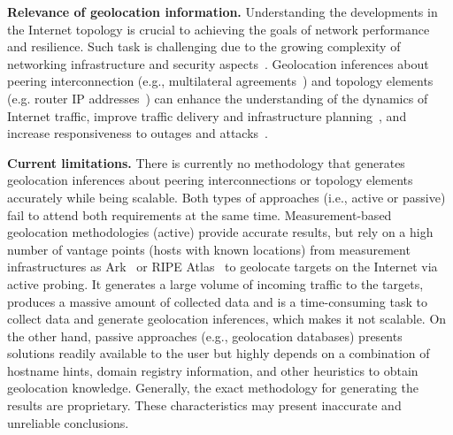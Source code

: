 	\textbf{Relevance of geolocation information.} Understanding the developments in the Internet topology is crucial to achieving the goals of network performance and resilience. Such task is challenging due to the growing complexity of networking infrastructure and security aspects~\cite{Giotsas:2015:MPI:2716281.2836122}. Geolocation inferences about peering interconnection (e.g., multilateral agreements~\cite{Giotsas:2013}) and topology elements (e.g. router IP addresses~\cite{8002903,Huffaker:2014:DDR:2656877.2656879}) can enhance the understanding of the dynamics of Internet traffic, improve traffic delivery and infrastructure planning~\cite{Calder:2013:MEG:2504730.2504754}, and increase responsiveness to outages and attacks~\cite{Giotsas:2017:DPI:3098822.3098855, marcos:2018:dynamix}. 


	\textbf{Current limitations.} There is currently no methodology that generates geolocation inferences about peering interconnections or topology elements accurately while being scalable. Both types of approaches (i.e., active or passive) fail to attend both requirements at the same time.  Measurement-based geolocation methodologies (active) provide accurate results, but rely on a high number of vantage points (hosts with known locations) from measurement infrastructures as Ark~\cite{ark} or RIPE Atlas~\cite{ripeatlas} to geolocate targets on the Internet via active probing. It generates a large volume of incoming traffic to the targets, produces a massive amount of collected data and is a time-consuming task to collect data and generate geolocation inferences, which makes it not scalable.  On the other hand, passive approaches (e.g., geolocation databases) presents solutions readily available to the user but highly depends on a combination of hostname hints, domain registry information, and other heuristics to obtain geolocation knowledge. Generally, the exact methodology for generating the results are proprietary. These characteristics may present inaccurate and unreliable conclusions.

